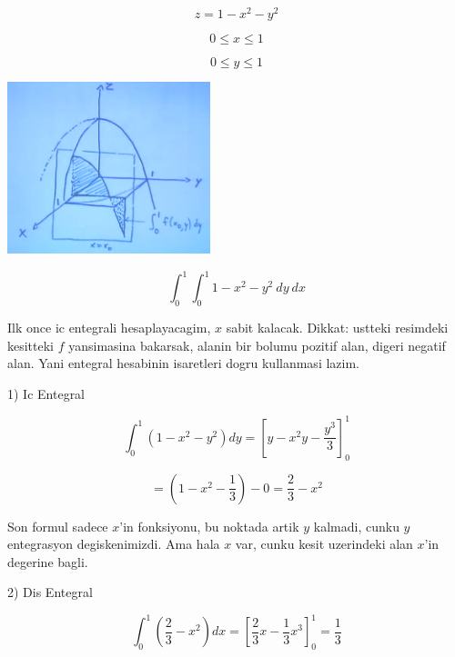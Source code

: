 \documentclass[12pt,fleqn]{article}
\begin{document}
\[ z = 1 - x^2 - y^2 \]

\[ 0 \le x \le 1 \]

\[ 0 \le y \le 1 \]

\includegraphics[height=5cm]{16_8.png}

\[ \int_0^1 \int_0^1  1-x^2-y^2 \ dy \ dx \]

Ilk once ic entegrali hesaplayacagim, $x$ sabit kalacak. Dikkat: ustteki
resimdeki kesitteki $f$ yansimasina bakarsak, alanin bir bolumu pozitif
alan, digeri negatif alan. Yani entegral hesabinin isaretleri dogru
kullanmasi lazim. 

1) Ic Entegral

\[ \int_0^1 (1-x^2-y^2) dy = [y - x^2y - \frac{y^3}{3}]_0^1 \]

\[ = (1 - x^2 - \frac{1}{3}) - 0 = \frac{2}{3} - x^2\]

Son formul sadece $x$'in fonksiyonu, bu noktada artik $y$ kalmadi, cunku
$y$ entegrasyon degiskenimizdi. Ama hala $x$ var, cunku kesit uzerindeki
alan $x$'in degerine bagli. 

2) Dis Entegral 

\[ \int_0^1 (\frac{2}{3} - x^2)dx = [\frac{2}{3}x - \frac{1}{3}x^3]_0^1 = 
\frac{1}{3}
 \]
\end{document}
